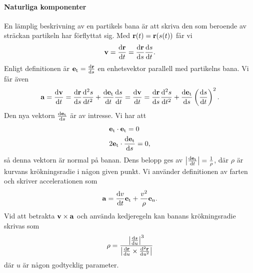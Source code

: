 \paragraph{Naturliga komponenter}
En lämplig beskrivning av en partikels bana är att skriva den som beroende av sträckan partikeln har förflyttat sig. Med $\vect{r}(t) = \vect{r}(s(t))$ får vi
\begin{align*}
	\vect{v} = \dv{\vect{r}}{t} = \dv{\vect{r}}{s}\dv{s}{t}.
\end{align*}
Enligt definitionen är $\vect{e}_\text{t} = \dv{\vect{r}}{s}$ en enhetsvektor parallell med partikelns bana. Vi får även
\begin{align*}
	\vect{a} = \dv{\vect{v}}{t} = \dv{\vect{r}}{s}\dv[2]{s}{t} + \dv{\vect{e}_\text{t}}{t}\dv{s}{t} = \dv{\vect{v}}{t} = \dv{\vect{r}}{s}\dv[2]{s}{t} + \dv{\vect{e}_\text{t}}{s}\left(\dv{s}{t}\right)^2.
\end{align*}
Den nya vektorn $\dv{\vect{e}_\text{t}}{s}$ är av intresse. Vi har att
\begin{align*}
	&\vect{e}_\text{t}\cdot\vect{e}_\text{t} = 0 \\
	&2\vect{e}_\text{t}\cdot\dv{\vect{e}_\text{t}}{s} = 0,
\end{align*}
så denna vektorn är normal på banan. Dens belopp ges av $\abs{\dv{\vect{e}_\text{t}}{t}} = \frac{1}{\rho}$, där $\rho$ är kurvans krökningsradie i någon given punkt. Vi använder definitionen av farten och skriver accelerationen som
\begin{align*}
	\vect{a} = \dv{v}{t}\vect{e}_\text{t} + \frac{v^2}{\rho}\vect{e}_\text{n}.
\end{align*}
Vid att betrakta $\vect{v}\times\vect{a}$ och använda kedjeregeln kan banans krökningsradie skrivas som
\begin{align*}
	\rho = \frac{\abs{\dv{s}{u}}^3}{\abs{\dv{\vect{r}}{u}\times\dv[2]{\vect{r}}{u}}}
\end{align*}
där $u$ är någon godtycklig parameter.